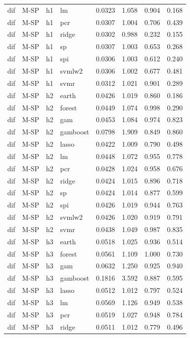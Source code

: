 \begin{ThreePartTable}
\begin{longtable}[t]{llclcccc}
dif & M-SP & h1 & lm & 0.0323 & 1.058 & 0.904 & 0.168\\
dif & M-SP & h1 & pcr & 0.0307 & 1.004 & 0.706 & 0.439\\
dif & M-SP & h1 & ridge & 0.0302 & 0.988 & 0.232 & 0.155\\
dif & M-SP & h1 & sp & 0.0307 & 1.003 & 0.653 & 0.268\\
dif & M-SP & h1 & spi & 0.0306 & 1.003 & 0.612 & 0.240\\
dif & M-SP & h1 & svmlw2 & 0.0306 & 1.002 & 0.677 & 0.481\\
dif & M-SP & h1 & svmr & 0.0312 & 1.021 & 0.901 & 0.289\\
\addlinespace
dif & M-SP & h2 & earth & 0.0426 & 1.019 & 0.860 & 0.186\\
dif & M-SP & h2 & forest & 0.0449 & 1.074 & 0.998 & 0.290\\
dif & M-SP & h2 & gam & 0.0453 & 1.084 & 0.974 & 0.823\\
dif & M-SP & h2 & gamboost & 0.0798 & 1.909 & 0.849 & 0.860\\
dif & M-SP & h2 & lasso & 0.0422 & 1.009 & 0.790 & 0.498\\
dif & M-SP & h2 & lm & 0.0448 & 1.072 & 0.955 & 0.778\\
dif & M-SP & h2 & pcr & 0.0428 & 1.024 & 0.958 & 0.676\\
dif & M-SP & h2 & ridge & 0.0424 & 1.015 & 0.896 & 0.718\\
dif & M-SP & h2 & sp & 0.0424 & 1.014 & 0.877 & 0.599\\
dif & M-SP & h2 & spi & 0.0426 & 1.019 & 0.944 & 0.763\\
dif & M-SP & h2 & svmlw2 & 0.0426 & 1.020 & 0.919 & 0.791\\
dif & M-SP & h2 & svmr & 0.0438 & 1.049 & 0.987 & 0.835\\
\addlinespace
dif & M-SP & h3 & earth & 0.0518 & 1.025 & 0.936 & 0.514\\
dif & M-SP & h3 & forest & 0.0561 & 1.109 & 1.000 & 0.730\\
dif & M-SP & h3 & gam & 0.0632 & 1.250 & 0.925 & 0.940\\
dif & M-SP & h3 & gamboost & 0.1816 & 3.592 & 0.887 & 0.595\\
dif & M-SP & h3 & lasso & 0.0512 & 1.012 & 0.797 & 0.524\\
dif & M-SP & h3 & lm & 0.0569 & 1.126 & 0.949 & 0.538\\
dif & M-SP & h3 & pcr & 0.0519 & 1.027 & 0.948 & 0.784\\
dif & M-SP & h3 & ridge & 0.0511 & 1.012 & 0.779 & 0.496\\

\end{longtable}
\end{ThreePartTable}
